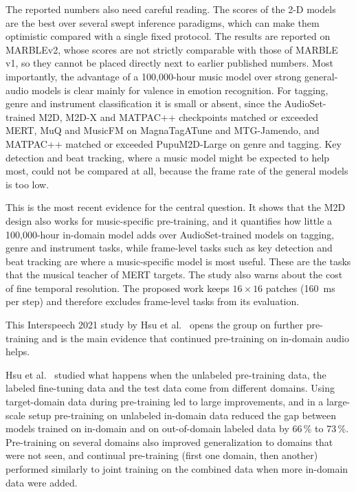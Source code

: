 \documentclass{FastFyp}
\begin{document}
The reported numbers also need careful reading. The scores of the 2-D models are the best over several swept inference paradigms, which can make them optimistic compared with a single fixed protocol. The results are reported on MARBLEv2, whose scores are not strictly comparable with those of MARBLE v1, so they cannot be placed directly next to earlier published numbers. Most importantly, the advantage of a 100,000-hour music model over strong general-audio models is clear mainly for valence in emotion recognition. For tagging, genre and instrument classification it is small or absent, since the AudioSet-trained M2D, M2D-X and MATPAC++ checkpoints matched or exceeded MERT, MuQ and MusicFM on MagnaTagATune and MTG-Jamendo, and MATPAC++ matched or exceeded PupuM2D-Large on genre and tagging. Key detection and beat tracking, where a music model might be expected to help most, could not be compared at all, because the frame rate of the general models is too low.

\lrrelation
This is the most recent evidence for the central question. It shows that the M2D design also works for music-specific pre-training, and it quantifies how little a 100,000-hour in-domain model adds over AudioSet-trained models on tagging, genre and instrument tasks, while frame-level tasks such as key detection and beat tracking are where a music-specific model is most useful. These are the tasks that the musical teacher of MERT targets. The study also warns about the cost of fine temporal resolution. The proposed work keeps $16\times16$ patches (160~ms per step) and therefore excludes frame-level tasks from its evaluation.

This Interspeech 2021 study by Hsu et al.~\cite{ref:Hsu:2021robustw2v2} opens the group on further pre-training and is the main evidence that continued pre-training on in-domain audio helps.

\lrsummary
Hsu et al.~\cite{ref:Hsu:2021robustw2v2} studied what happens when the unlabeled pre-training data, the labeled fine-tuning data and the test data come from different domains. Using target-domain data during pre-training led to large improvements, and in a large-scale setup pre-training on unlabeled in-domain data reduced the gap between models trained on in-domain and on out-of-domain labeled data by 66\,\% to 73\,\%. Pre-training on several domains also improved generalization to domains that were not seen, and continual pre-training (first one domain, then another) performed similarly to joint training on the combined data when more in-domain data were added.
\end{document}
